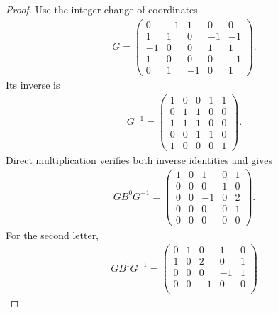 \begin{proof}
    \leanok
    Use the integer change of coordinates
    \begin{align}
        G=\begin{pmatrix}
              0  & -1 & 1  & 0  & 0  \\
              1  & 1  & 0  & -1 & -1 \\
              -1 & 0  & 0  & 1  & 1  \\
              1  & 0  & 0  & 0  & -1 \\
              0  & 1  & -1 & 0  & 1
          \end{pmatrix}.
        \label{eq:asymex_parity_gauge}
    \end{align}
    Its inverse is
    \begin{align}
        G^{-1}=\begin{pmatrix}
                   1 & 0 & 0 & 1 & 1 \\
                   0 & 1 & 1 & 0 & 0 \\
                   1 & 1 & 1 & 0 & 0 \\
                   0 & 0 & 1 & 1 & 0 \\
                   1 & 0 & 0 & 0 & 1
               \end{pmatrix}.
        \label{eq:asymex_parity_gauge_inv}
    \end{align}
    Direct multiplication verifies both inverse identities and gives
    \begin{align}
        GB^0G^{-1}
        =\begin{pmatrix}
             1 & 0 & 1  & 0 & 1 \\
             0 & 0 & 0  & 1 & 0 \\
             0 & 0 & -1 & 0 & 2 \\
             0 & 0 & 0  & 0 & 1 \\
             0 & 0 & 0  & 0 & 0
         \end{pmatrix}.
        \label{eq:asymex_parity_conj_zero}
    \end{align}
    For the second letter,
    \begin{align}
        GB^1G^{-1}
        =\begin{pmatrix}
             0 & 1 & 0  & 1  & 0 \\
             1 & 0 & 2  & 0  & 1 \\
             0 & 0 & 0  & -1 & 1 \\
             0 & 0 & -1 & 0  & 0 \\

\end{pmatrix}
\end{align}
\end{proof}
